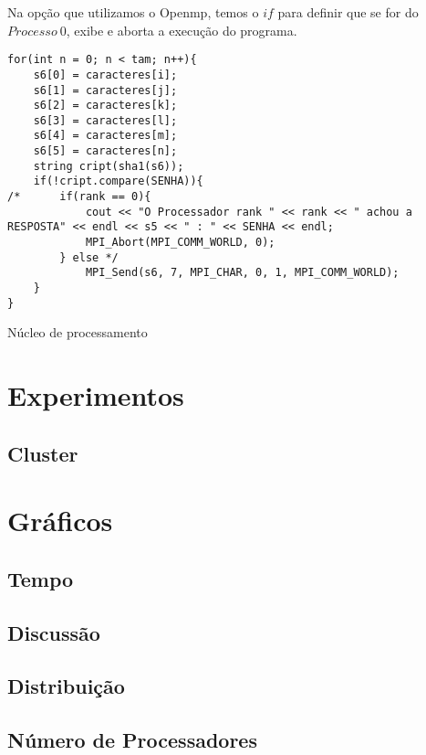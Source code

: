 \documentclass[10pt,journal,compsoc]{IEEEtran}
\begin{document}
Na opção que utilizamos o Openmp, temos o $if$ para definir que se for do $Processo~0$, exibe e aborta a  execução do programa.
\begin{listing}[ht]
\begin{verbatim}
for(int n = 0; n < tam; n++){
    s6[0] = caracteres[i];
    s6[1] = caracteres[j];
    s6[2] = caracteres[k];
    s6[3] = caracteres[l];
    s6[4] = caracteres[m];
    s6[5] = caracteres[n];
    string cript(sha1(s6));
    if(!cript.compare(SENHA)){
/*      if(rank == 0){
            cout << "O Processador rank " << rank << " achou a RESPOSTA" << endl << s5 << " : " << SENHA << endl;
            MPI_Abort(MPI_COMM_WORLD, 0);
        } else */
            MPI_Send(s6, 7, MPI_CHAR, 0, 1, MPI_COMM_WORLD);
    }
}
\end{verbatim}
\caption{Núcleo de processamento}
\end{listing}

\section{Experimentos}
\label{sec:experimentos}
    
    \subsection{Cluster}
    \label{sec:cluster}

\section{Gráficos}
\label{sec:graficos}
    
    \subsection{Tempo}
    \label{sec:tempo}
    
    \subsection{Discussão}
    \label{sec:discussao}   
 
    \subsection{Distribuição}
    \label{sec:distribuicao}
    
    \subsection{Número de Processadores}
    \label{sec:numeroProcessadores}
\end{document}
